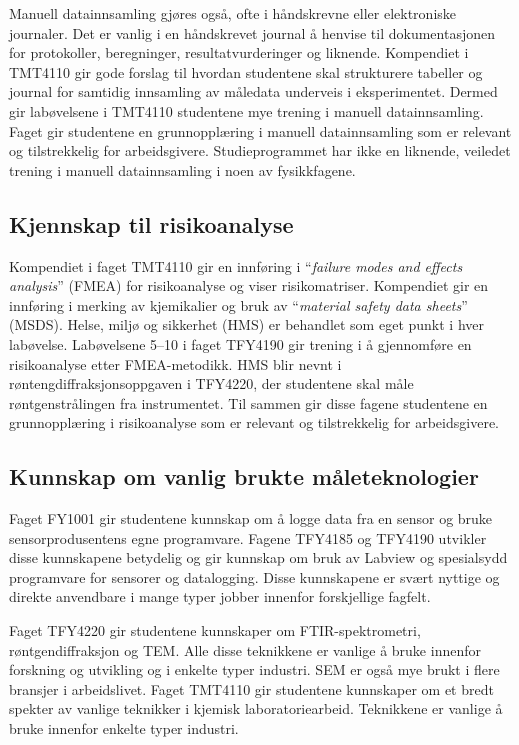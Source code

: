 \documentclass{article}
\begin{document}
Manuell datainnsamling gjøres også, ofte i håndskrevne eller elektroniske journaler. Det er vanlig i en håndskrevet journal å henvise til dokumentasjonen for protokoller, beregninger, resultatvurderinger og liknende. Kompendiet i TMT4110 gir gode forslag til hvordan studentene skal strukturere tabeller og journal for samtidig innsamling av måledata underveis i eksperimentet. Dermed gir labøvelsene i TMT4110 studentene mye trening i manuell datainnsamling. Faget gir studentene en grunnopplæring i manuell datainnsamling som er relevant og tilstrekkelig for arbeidsgivere. Studieprogrammet har ikke en liknende, veiledet trening i manuell datainnsamling i noen av fysikkfagene.

\subsection{Kjennskap til risikoanalyse}
Kompendiet i faget TMT4110 gir en innføring i ``\emph{failure modes and effects analysis}'' (FMEA) for risikoanalyse og viser risikomatriser. Kompendiet gir en innføring i merking av kjemikalier og bruk av ``\emph{material safety data sheets}'' (MSDS). Helse, miljø og sikkerhet (HMS) er behandlet som eget punkt i hver labøvelse. Labøvelsene 5--10 i faget TFY4190 gir trening i å gjennomføre en risikoanalyse etter FMEA-metodikk. HMS blir nevnt i røntengdiffraksjonsoppgaven i TFY4220, der studentene skal måle røntgenstrålingen fra instrumentet. Til sammen gir disse fagene studentene en grunnopplæring i risikoanalyse som er relevant og tilstrekkelig for arbeidsgivere.

\subsection{Kunnskap om vanlig brukte måleteknologier}
\label{Teknikker}
Faget FY1001 gir studentene kunnskap om å logge data fra en sensor og bruke sensorprodusentens egne programvare. Fagene TFY4185 og TFY4190 utvikler disse kunnskapene betydelig og gir kunnskap om bruk av Labview og spesialsydd programvare for sensorer og datalogging. Disse kunnskapene er svært nyttige og direkte anvendbare i mange typer jobber innenfor forskjellige fagfelt.

Faget TFY4220 gir studentene kunnskaper om FTIR-spektrometri, røntgendiffraksjon og TEM. Alle disse teknikkene er vanlige å bruke innenfor forskning og utvikling og i enkelte typer industri. SEM er også mye brukt i flere bransjer i arbeidslivet. Faget TMT4110 gir studentene kunnskaper om et bredt spekter av vanlige teknikker i kjemisk laboratoriearbeid. Teknikkene er vanlige å bruke innenfor enkelte typer industri.
\end{document}
